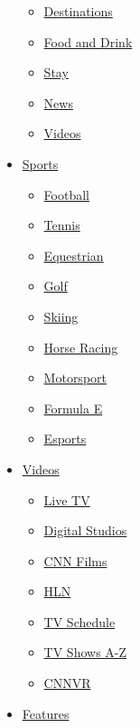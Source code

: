 \begin{itemize}
  \begin{itemize}
  \tightlist
  \item
    \href{/travel/destinations}{Destinations}
  \item
    \href{/travel/food-and-drink}{Food and Drink}
  \item
    \href{/travel/stay}{Stay}
  \item
    \href{/travel/news}{News}
  \item
    \href{/travel/videos}{Videos}
  \end{itemize}
\item
  \href{/sport}{Sports}

  \begin{itemize}
  \tightlist
  \item
    \href{/sport/football}{Football}
  \item
    \href{/sport/tennis}{Tennis}
  \item
    \href{/sport/equestrian}{Equestrian}
  \item
    \href{/sport/golf}{Golf}
  \item
    \href{/sport/skiing}{Skiing}
  \item
    \href{/sport/horse-racing}{Horse Racing}
  \item
    \href{/sport/motorsport}{Motorsport}
  \item
    \href{/specials/sport/formula-e}{Formula E}
  \item
    \href{/specials/esports}{Esports}
  \end{itemize}
\item
  \href{/videos}{Videos}

  \begin{itemize}
  \tightlist
  \item
    \href{//cnn.it/go2}{Live TV}
  \item
    \href{/specials/digital-studios}{Digital Studios}
  \item
    \href{/specials/videos/digital-shorts}{CNN Films}
  \item
    \href{/specials/videos/hln}{HLN}
  \item
    \href{/tv/schedule/cnn}{TV Schedule}
  \item
    \href{/specials/tv/all-shows}{TV Shows A-Z}
  \item
    \href{/vr}{CNNVR}
  \end{itemize}
\item
  \href{/specials}{Features}


\end{itemize}
